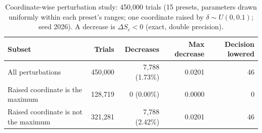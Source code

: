 \begin{table}[!t]
\caption{Coordinate-wise perturbation study: 450,000 trials (15 presets, parameters drawn uniformly within each
preset's ranges; one coordinate raised by $\delta\sim U(0,0.1)$; seed 2026).
A decrease is $\Delta S_c<0$ (exact, double precision).}
\label{tab:perturbation}
\centering\footnotesize
\begin{tabular}{@{}lrrrr@{}}
\toprule
\textbf{Subset} & \textbf{Trials} & \textbf{Decreases} & \textbf{Max decrease} & \textbf{Decision lowered} \\
\midrule
All perturbations & 450,000 & 7,788 (1.73\%) & 0.0201 & 46 \\
Raised coordinate is the maximum & 128,719 & 0 (0.00\%) & 0.0000 & 0 \\
Raised coordinate is not the maximum & 321,281 & 7,788 (2.42\%) & 0.0201 & 46 \\
\bottomrule
\end{tabular}
\end{table}
